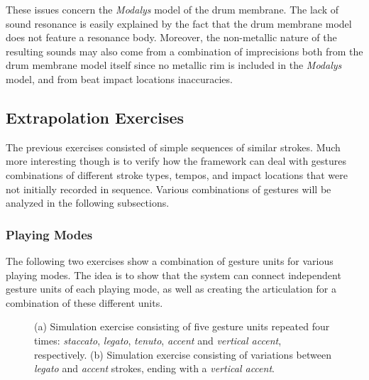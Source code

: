 These issues concern the \emph{Modalys} model of the drum membrane. The lack of sound resonance is easily explained by the fact that the drum membrane model does not feature a resonance body. Moreover, the non-metallic nature of the resulting sounds may also come from a combination of imprecisions both from the drum membrane model itself since no metallic rim is included in the \emph{Modalys} model, and from beat impact locations inaccuracies.


		\subsection{Extrapolation Exercises}
		\label{subsec:Music_Evaluation_Extrapolation}

The previous exercises consisted of simple sequences of similar strokes. Much more interesting though is to verify how the framework can deal with gestures combinations of different stroke types, tempos, and impact locations that were not initially recorded in sequence. Various combinations of gestures will be analyzed in the following subsections.


			\subsubsection{Playing Modes}
			\label{subsubsec:Music_Evaluation_Extrapolation_GestureVariations}
		
The following two exercises show a combination of gesture units for various playing modes. The idea is to show that the system can connect independent gesture units of each playing mode, as well as creating the articulation for a combination of these different units.

\begin{figure}%
	\begin{center}
		\hspace{0.5cm}
	\end{center}
	\vspace{-0.5cm}
	\caption[Simulated exercises: extrapolation of playing modes]{(a) Simulation exercise consisting of five gesture units repeated four times: \emph{staccato}, \emph{legato}, \emph{tenuto}, \emph{accent} and \emph{vertical accent}, respectively. (b) Simulation exercise consisting of variations between \emph{legato} and \emph{accent} strokes, ending with a \emph{vertical accent}.}
	\label{fig:gesture}
\end{figure}

